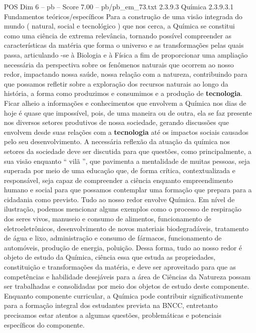 \begin{textsample}{POS Dim 6 – pb – Score 7.00 – pb/pb\_em\_73.txt}  \label{ex:f6_pos_207}
2.3.9.3 Química 2.3.9.3.1 Fundamentos teóricos/específicos Para a construção de uma visão integrada do mundo ( natural, social e tecnológico ) que nos cerca, a Química se constitui como uma ciência de extrema relevância, tornando possível compreender as características da matéria que forma o universo e as transformações pelas quais passa, articulando -se à Biologia e à Física a fim de proporcionar uma ampliação necessária da perspectiva sobre os fenômenos naturais que ocorrem ao nosso redor, impactando nossa saúde, nossa relação com a natureza, contribuindo para que possamos refletir sobre a exploração dos recursos naturais ao longo da história, a forma como produzimos e consumimos e a produção de \textbf{tecnologia}.
Ficar alheio a informações e conhecimentos que envolvem a Química nos dias de hoje é quase que impossível, pois, de uma maneira ou de outra, ela se faz presente nos diversos setores produtivos de nossa sociedade, gerando discussões que envolvem desde suas relações com a \textbf{tecnologia} até os impactos sociais causados pelo seu desenvolvimento.
A necessária reflexão da atuação da química nos setores da sociedade deve ser discutida para que questões, como principalmente, a sua visão enquanto “ vilã ”, que pavimenta a mentalidade de muitas pessoas, seja superada por meio de uma educação que, de forma crítica, contextualizada e responsável, seja capaz de compreender a ciência enquanto empreendimento humano e social para que possamos contemplar uma formação que prepara para a cidadania como previsto.
Tudo ao nosso redor envolve Química.
Em nível de ilustração, podemos mencionar alguns exemplos como o processo de respiração dos seres vivos, manuseio e consumo de alimentos, funcionamento de eletroeletrônicos, desenvolvimento de novos materiais biodegradáveis, tratamento de água e lixo, administração e consumo de fármacos, funcionamento de automóveis, produção de energia, poluição.
Dessa forma, tudo ao nosso redor é objeto de estudo da Química, ciência essa que estuda as propriedades, constituição e transformações da matéria, e deve ser aproveitado para que as competências e habilidade desejáveis para a área de Ciências da Natureza possam ser trabalhadas e consolidadas por meio dos objetos de estudo deste componente.
Enquanto componente curricular, a Química pode contribuir significativamente para a formação integral dos estudantes prevista na BNCC, entretanto precisamos estar atentos a algumas questões, problemáticas e potenciais específicos do componente.

\end{textsample}
